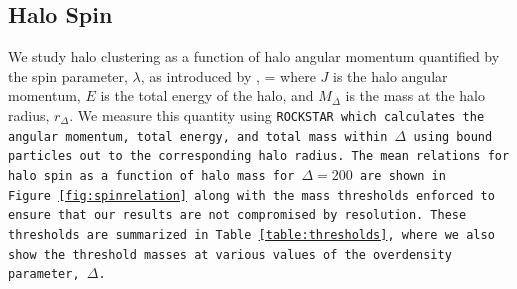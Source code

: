 \documentclass[usenatbib]{mnras}
\begin{document}
\subsection{Halo Spin}

We study halo clustering as a function of halo angular momentum quantified 
by the spin parameter, $\lambda$, as introduced by \citep{peebles69},
\beq
\lambda = 
\eeq
where $J$ is the halo angular momentum, $E$ is the total energy of the 
halo, and $M_{\Delta}$ is the mass at the halo radius, $r_{\Delta}$. We measure
this quantity using \tt{ROCKSTAR} which calculates the angular momentum, total energy,
and total mass within $\Delta$ using bound particles out to the corresponding halo radius.
The mean relations for halo spin as a function of halo mass for $\Delta=200$ 
are shown in Figure~\ref{fig:spinrelation} along with the mass thresholds 
enforced to ensure that our results are not compromised by resolution. 
These thresholds are summarized in Table~\ref{table:thresholds}, where 
we also show the threshold masses at various values of the overdensity 
parameter, $\Delta$.
\end{document}
